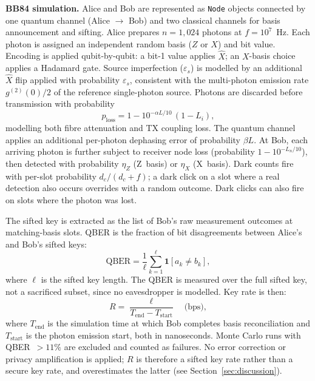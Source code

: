\documentclass[12pt]{article}
\begin{document}
\textbf{BB84 simulation.} Alice and Bob are represented as \texttt{Node} objects connected by one quantum channel (Alice $\to$ Bob) and two classical channels for basis announcement and sifting. Alice prepares $n = 1{,}024$ photons at $f = 10^7$~Hz. Each photon is assigned an independent random basis ($Z$ or $X$) and bit value. Encoding is applied qubit-by-qubit: a bit-1 value applies $\hat{X}$; an $X$-basis choice applies a Hadamard gate. Source imperfection ($\varepsilon_s$) is modelled by an additional $\hat{X}$ flip applied with probability $\varepsilon_s$, consistent with the multi-photon emission rate $g^{(2)}(0)/2$ of the reference single-photon source. Photons are discarded before transmission with probability
\begin{equation}
    p_\text{loss} = 1 - 10^{-\alpha L/10}\,(1 - L_i),
\end{equation}
modelling both fibre attenuation and TX coupling loss. The quantum channel applies an additional per-photon dephasing error of probability $\beta L$. At Bob, each arriving photon is further subject to receiver node loss (probability $1 - 10^{-L_n/10}$), then detected with probability $\eta_Z$ (Z~basis) or $\eta_X$ (X~basis). Dark counts fire with per-slot probability $d_c / (d_c + f)$; a dark click on a slot where a real detection also occurs overrides with a random outcome. Dark clicks can also fire on slots where the photon was lost.

The sifted key is extracted as the list of Bob's raw measurement outcomes at matching-basis slots. QBER is the fraction of bit disagreements between Alice's and Bob's sifted keys:
\begin{equation}
    \text{QBER} = \frac{1}{\ell}\sum_{k=1}^{\ell}\mathbf{1}[a_k \neq b_k],
    \label{eq:qber}
\end{equation}
where $\ell$ is the sifted key length. The QBER is measured over the full sifted key, not a sacrificed subset, since no eavesdropper is modelled. Key rate is then:
\begin{equation}
    R = \frac{\ell}{T_\text{end} - T_\text{start}} \quad \text{(bps)},
    \label{eq:key_rate}
\end{equation}
where $T_\text{end}$ is the simulation time at which Bob completes basis reconciliation and $T_\text{start}$ is the photon emission start, both in nanoseconds. Monte Carlo runs with QBER~$> 11\%$ are excluded and counted as failures. No error correction or privacy amplification is applied; $R$ is therefore a sifted key rate rather than a secure key rate, and overestimates the latter (see Section~\ref{sec:discussion}).
\end{document}

